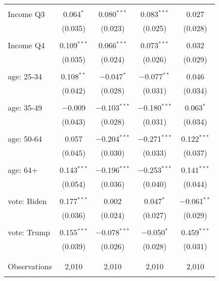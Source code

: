 \begin{tabular}{@{\extracolsep{5pt}}lcccc}
  & & & & \\ 
 Income Q3 & 0.064$^{*}$ & 0.080$^{***}$ & 0.083$^{***}$ & 0.027 \\ 
  & (0.035) & (0.023) & (0.025) & (0.028) \\ 
  & & & & \\ 
 Income Q4 & 0.109$^{***}$ & 0.066$^{***}$ & 0.073$^{***}$ & 0.032 \\ 
  & (0.035) & (0.024) & (0.026) & (0.029) \\ 
  & & & & \\ 
 age: 25-34 & 0.108$^{**}$ & $-$0.047$^{*}$ & $-$0.077$^{**}$ & 0.046 \\ 
  & (0.042) & (0.028) & (0.031) & (0.034) \\ 
  & & & & \\ 
 age: 35-49 & $-$0.009 & $-$0.103$^{***}$ & $-$0.180$^{***}$ & 0.063$^{*}$ \\ 
  & (0.043) & (0.028) & (0.031) & (0.034) \\ 
  & & & & \\ 
 age: 50-64 & 0.057 & $-$0.204$^{***}$ & $-$0.271$^{***}$ & 0.122$^{***}$ \\ 
  & (0.045) & (0.030) & (0.033) & (0.037) \\ 
  & & & & \\ 
 age: 64+ & 0.143$^{***}$ & $-$0.196$^{***}$ & $-$0.253$^{***}$ & 0.141$^{***}$ \\ 
  & (0.054) & (0.036) & (0.040) & (0.044) \\ 
  & & & & \\ 
 vote: Biden & 0.177$^{***}$ & 0.002 & 0.047$^{*}$ & $-$0.061$^{**}$ \\ 
  & (0.036) & (0.024) & (0.027) & (0.029) \\ 
  & & & & \\ 
 vote: Trump & 0.155$^{***}$ & $-$0.078$^{***}$ & $-$0.050$^{*}$ & 0.459$^{***}$ \\ 
  & (0.039) & (0.026) & (0.028) & (0.031) \\ 
  & & & & \\ 
\hline \\[-1.8ex] 

Observations & 2,010 & 2,010 & 2,010 & 2,010 \\ 
\hline 
\hline \\[-1.8ex] 
\end{tabular} 